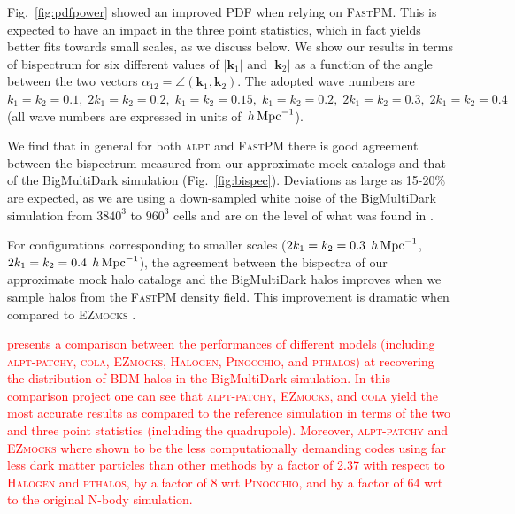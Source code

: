 \documentclass[english,usenatbib]{mn2e}
\newcommand{\tod}[1]{{\textcolor{red}{ #1}}}
\newcommand{\hperm}{\,h\,{\rm Mpc}^{-1}}
\begin{document}
Fig.~\ref{fig:pdfpower} showed an improved PDF when relying on \textsc{FastPM}. This is expected to have an impact in the three point statistics, which in fact yields better fits towards small scales, as we discuss below. 
We show our results in terms of bispectrum for six different values of $|\mathbf{k}_1|$ and $|\mathbf{k}_2|$ as a function of the angle between the two vectors $\alpha_{12} = \angle (\mathbf{k}_1 , \mathbf{k}_2)$. The adopted wave numbers are $k_1=k_2=0.1,\; 2k_1=k_2=0.2,\; k_1=k_2=0.15,\; k_1=k_2=0.2,\; 2k_1=k_2=0.3,\; 2k_1=k_2=0.4$ (all wave numbers are expressed in units of $\hperm$). 

We find that in general for both \textsc{alpt} and \textsc{FastPM} there is good agreement between the bispectrum measured from our approximate mock catalogs and that of the BigMultiDark simulation (Fig.~\ref{fig:bispec}). 
Deviations as large as 15-20\% are expected, as we are using a down-sampled  white noise of the BigMultiDark simulation from $3840^3$ to $960^3$ cells and are on the level of what was found in \citet[][]{kitaura2015}. 


For configurations corresponding to smaller scales ($2k_1=k_2=0.3\;\hperm$, $2k_1=k_2=0.4\;\hperm$), the agreement between the bispectra of our approximate mock halo catalogs and the BigMultiDark halos improves when we sample halos from the \textsc{FastPM} density field. This improvement is dramatic when compared to \textsc{EZmocks} \citep[see real-space lines in the lower panels in Fig.~5 of][]{eazymock}. 

\tod{\citet{chuang2015} presents a comparison between the performances of different models (including \textsc{alpt-patchy}, \textsc{cola}, \textsc{EZmocks}, \textsc{Halogen}, \textsc{Pinocchio}, and \textsc{pthalos}) at recovering the distribution of BDM halos in the BigMultiDark simulation. In this comparison project one can see that \textsc{alpt-patchy}, \textsc{EZmocks}, and \textsc{cola} yield the most accurate results as compared to the reference simulation in terms of the two and three point statistics (including the quadrupole). Moreover, \textsc{alpt-patchy} and \textsc{EZmocks} where shown to be the less computationally demanding codes using far less dark matter particles than other methods by a factor of 2.37 with respect to \textsc{Halogen} and \textsc{pthalos}, by a factor of 8 wrt \textsc{Pinocchio}, and by a factor of 64 wrt to the original N-body simulation.}
\end{document}
